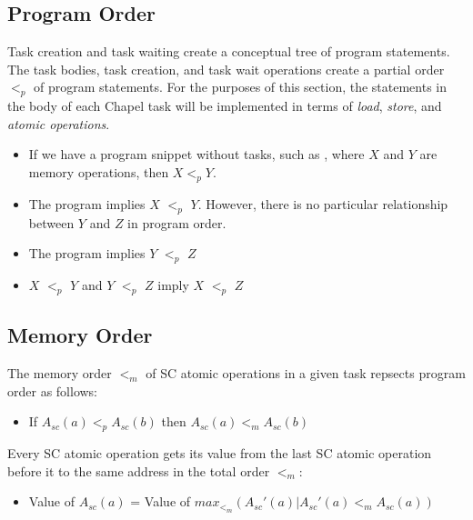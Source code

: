 \subsection{Program Order}
\label{program_order}

Task creation and task waiting create a conceptual tree of program
statements.  The task bodies, task creation, and task wait operations
create a partial order $<_p$ of program statements.  For the purposes
of this section, the statements in the body of each Chapel task will
be implemented in terms of \textit{load}, \textit{store}, and
\textit{atomic operations}.

\begin{itemize}
  \item If we have a program snippet without tasks, such as ,
  where $X$ and $Y$ are memory operations, then $X <_p Y$.

  \item The program  implies $X$ $<_p$ $Y$.
  However, there is no particular relationship between $Y$ and $Z$ in
  program order.

  \item The program  implies $Y$ $<_p$ $Z$

  \item $X$ $<_p$ $Y$ and $Y$ $<_p$ $Z$ imply $X$ $<_p$ $Z$

\end{itemize}


\subsection{Memory Order}
\label{memory_order}

The memory order $<_m$ of SC atomic operations in a given task
repsects program order as follows:

\begin{itemize}
  \item If $A_{sc}(a)<_pA_{sc}(b)$ then $A_{sc}(a)<_mA_{sc}(b)$
\end{itemize}

Every SC atomic operation gets its value from the last SC atomic
operation before it to the same address in the total order $<_m$:
\begin{itemize}
  \item Value of $A_{sc}(a)$ = Value of $max_{<_m} (
  A_{sc}'(a)|A_{sc}'(a) <_m A_{sc}(a) ) $
\end{itemize}

